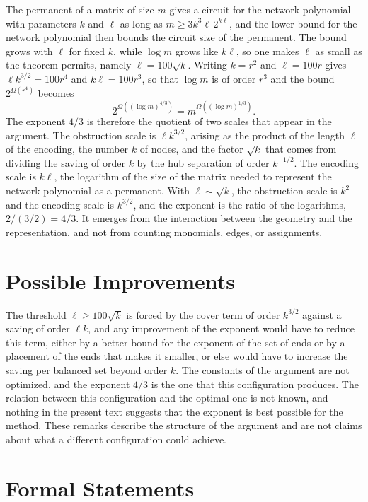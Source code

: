 \documentclass[11pt,letterpaper]{report}
\theoremstyle{plain}
\theoremstyle{definition}
\theoremstyle{remark}
\begin{document}
The permanent of a matrix of size $m$ gives a circuit for the network polynomial with parameters $k$ and $\ell$ as long as $m\ge3k^3\ell\,2^{k\ell}$, and the lower bound for the network polynomial then bounds the circuit size of the permanent. The bound grows with $\ell$ for fixed $k$, while $\log m$ grows like $k\ell$, so one makes $\ell$ as small as the theorem permits, namely $\ell=100\sqrt k$. Writing $k=r^2$ and $\ell=100r$ gives $\ell k^{3/2}=100r^4$ and $k\ell=100r^3$, so that $\log m$ is of order $r^3$ and the bound $2^{\Omega(r^4)}$ becomes
\[
2^{\Omega((\log m)^{4/3})}=m^{\Omega((\log m)^{1/3})}.
\]
The exponent $4/3$ is therefore the quotient of two scales that appear in the argument. The obstruction scale is $\ell k^{3/2}$, arising as the product of the length $\ell$ of the encoding, the number $k$ of nodes, and the factor $\sqrt k$ that comes from dividing the saving of order $k$ by the hub separation of order $k^{-1/2}$. The encoding scale is $k\ell$, the logarithm of the size of the matrix needed to represent the network polynomial as a permanent. With $\ell\sim\sqrt k$, the obstruction scale is $k^2$ and the encoding scale is $k^{3/2}$, and the exponent is the ratio of the logarithms, $2/(3/2)=4/3$. It emerges from the interaction between the geometry and the representation, and not from counting monomials, edges, or assignments.

\section{Possible Improvements}

The threshold $\ell\ge100\sqrt k$ is forced by the cover term of order $k^{3/2}$ against a saving of order $\ell k$, and any improvement of the exponent would have to reduce this term, either by a better bound for the exponent of the set of ends or by a placement of the ends that makes it smaller, or else would have to increase the saving per balanced set beyond order $k$. The constants of the argument are not optimized, and the exponent $4/3$ is the one that this configuration produces. The relation between this configuration and the optimal one is not known, and nothing in the present text suggests that the exponent is best possible for the method. These remarks describe the structure of the argument and are not claims about what a different configuration could achieve.

\section{Formal Statements}
\end{document}
